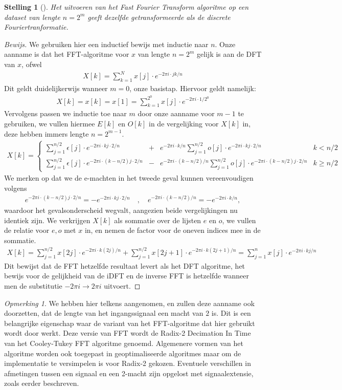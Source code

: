 \documentclass[11pt]{report}
\newcommand{\e}{\epsilon}
\theoremstyle{plain}
\newtheorem*{stelling}{Stelling}
\theoremstyle{remark}
\newtheorem*{opmerk}{Opmerking}
\newcommand{\eq}[1]{\begin{eqnarray*} #1 \end{eqnarray*}}
\begin{document}
\begin{stelling}[]
  Het uitvoeren van het Fast Fourier Transform algoritme op een dataset van lengte $n=2^m$ geeft
  dezelfde getransformeerde als de discrete Fouriertranformatie.
\end{stelling}
\begin{proof}[Bewijs]
We gebruiken hier een inductief bewijs met inductie naar $n$. Onze aanname is dat het FFT-algoritme voor $x$ van lengte $n=2^m$ gelijk is aan de DFT van $x$, ofwel
\eq{
  X[k] = \sum^{N}_{k=1} x[j] \cdot e^{-2\pi i \cdot jk/n}
}
Dit geldt duidelijkerwijs wanneer $m=0$, onze basistap. Hiervoor geldt namelijk:
\eq{
  X[k] = x[k] = x[1] = \sum^{2^0}_{k=1} x[j] \cdot e^{-2\pi i \cdot 1/2^0}
}
Vervolgens passen we inductie toe naar $m$ door onze aanname voor $m-1$ te gebruiken,
we vullen hiermee $E[k]$ en $O[k]$ in de vergelijking voor $X[k]$ in, deze hebben immers lengte $n=2^{m-1}$.
\eq{
  X[k] = \left\{\begin{array}{llll}
    \sum^{n/2}_{j=1} \e[j] 
    \cdot e^{-2\pi i \cdot kj \cdot 2/n} &+& 
    e^{-2\pi i \cdot k/n}
    \sum^{n/2}_{j=1} o[j] 
    \cdot e^{-2\pi i\cdot kj \cdot 2/n} &  k< n/2 \\
    \sum^{n/2}_{j=1} \e[j] 
    \cdot e^{-2\pi i\cdot (k-n/2) j\cdot 2/n} &-& 
    e^{-2\pi i\cdot (k-n/2)/n}
    \sum^{n/2}_{j=1} o[j] \cdot e^{-2\pi i\cdot (k-n/2)j\cdot 2/n} &  k\geq n/2 
  \end{array}\right.
}
We merken op dat we de e-machten in het tweede geval kunnen vereenvoudigen volgens
\eq{
  e^{-2\pi i\cdot (k-n/2)j \cdot 2/n} 
  = - e^{-2\pi i\cdot kj\cdot 2/n} \quad,\quad e^{-2\pi i\cdot(k-n/2)/n} 
= -e^{-2\pi i\cdot k/n},
}
waardoor het gevalsonderscheid wegvalt, aangezien beide vergelijkingen nu identiek zijn.
We verkrijgen $X[k]$ als sommatie over de lijsten $e$ en $o$, we vullen de relatie voor $e,o$ met $x$ in, en nemen de factor voor de oneven indices mee in de sommatie.
\eq{
  X[k] = \sum^{n/2}_{j=1} x[2j] \cdot e^{-2\pi i\cdot k (2j)/n} + 
    \sum^{n/2}_{j=1} x[2j+1] \cdot e^{-2\pi i\cdot k (2j+1)/n} 
    = \sum^n_{j=1} x[j] \cdot e^{-2\pi i\cdot k j/n}
}
Dit bewijst dat de FFT hetzelfde resultaat levert als het DFT algoritme, het bewijs voor de gelijkheid van de iDFT en de inverse FFT is 
hetzelfde wanneer men de substitutie $-2\pi i \rightarrow 2\pi i$ uitvoert.
\end{proof}

\begin{opmerk}
We hebben hier telkens aangenomen, en zullen deze aanname ook doorzetten, 
dat de lengte van het ingangssignaal een macht van $2$ is. Dit is een belangrijke
eigenschap waar de variant van het FFT-algoritme dat hier gebruikt wordt door werkt. Deze versie van FFT wordt
de Radix-2 Decimation In Time van het Cooley-Tukey FFT algoritme genoemd. Algemenere vormen van het algoritme
worden ook toegepast in geoptimaliseerde algoritmes maar om de implementatie te versimpelen 
is voor Radix-2 gekozen. Eventuele verschillen in afmetingen tussen een signaal en 
een 2-macht zijn opgelost met signaalextensie, zoals eerder beschreven.
\end{opmerk}
\end{document}
